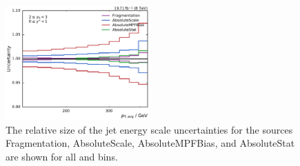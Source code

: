 \begin{figure}[h!tbp]
    \includegraphics[width=0.49\textwidth]{figures/measurement/jec_relunc_0_yb2ys0.pdf}
    \caption[Split-up of JEC uncertainty sources: Part I]{The relative size of the jet energy scale
             uncertainties for the sources Fragmentation, AbsoluteScale,
             AbsoluteMPFBias,
             and AbsoluteStat are shown for all \ystar and \yboost bins.}
\label{fig:jec_relunc_0}
\end{figure}

